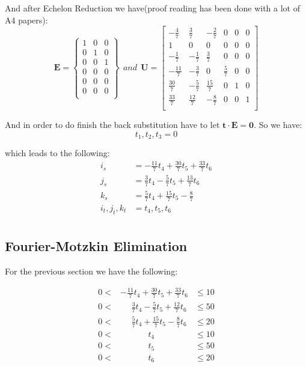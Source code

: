 \documentclass[12pt]{article}
\begin{document}
And after Echelon Reduction we have(proof reading has been done with a
lot of A4 papers):
\begin{equation}
  \pmb{E} = \begin{Bmatrix}
    1 & 0 & 0 \\
0 & 1 & 0 \\
0 & 0 & 1 \\
0 & 0 & 0 \\
0 & 0 & 0 \\
0 & 0 & 0 \\
  \end{Bmatrix}
~~and~~ \pmb{U}
=
\begin{bmatrix}
  -\frac{4}{7} & \frac{3}{7} & -\frac{2}{7}  & 0 & 0  & 0 \\
 1 & 0 &  0 & 0 &  0 & 0 \\
 -\frac{1}{7} & -\frac{1}{7} & \frac{3}{7} & 0 & 0 & 0 \\
-\frac{11}{7}& -\frac{3}{7} & 0 & \frac{5}{7}  & 0 & 0 \\
\frac{30}{7} & -\frac{5}{7} & \frac{15}{7} & 0 & 1 & 0 \\
\frac{33}{7}& \frac{12}{7} & -\frac{8}{7} & 0 & 0 & 1 \\
\end{bmatrix}
\end{equation}

And in order to do finish the back substitution have to let
$\pmb{t\cdot E = 0}$. So we have:
$$t_1, t_2, t_3 = 0$$

which leads to the following:
\begin{equation}
  \begin{aligned}
    i_s &=  -\frac{11}{7}t_4+\frac{30}{7}t_5+\frac{33}{7}t_6\\
    j_s &=  \frac{3}{7}t_4-\frac{5}{7}t_5+\frac{13}{7}t_6\\
    k_s &=  \frac{5}{7}t_4+\frac{15}{7}t_5-\frac{8}{7} \\
    i_t, j_t, k_t &= t_4, t_5, t_6\\
  \end{aligned}
\end{equation}


\subsection{Fourier-Motzkin Elimination}
For the previous section we have the following:


\begin{equation}
  \begin{aligned}
    0 <&-\frac{11}{7}t_4+\frac{30}{7}t_5+\frac{33}{7}t_6 &\le 10 \\
    0 <& ~~~~~~\frac{3}{7}t_4-\frac{5}{7}t_5+\frac{12}{7}t_6 &\le 50 \\
0 <&~~~~~~ \frac{5}{7}t_4+\frac{15}{7}t_5-\frac{8}{7}t_6   &\le 20 \\
0 <& ~~~~~~~~~~~~~~~t_4 &\le 10 \\
0 <& ~~~~~~~~~~~~~~~t_5 &\le 50 \\
0 <& ~~~~~~~~~~~~~~~t_6 &\le 20 \\
  \end{aligned}
\end{equation}
\end{document}
